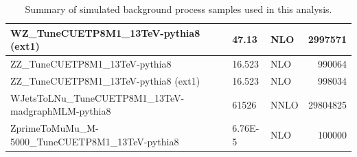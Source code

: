 \begin{table}[htbp!]
{\begin{tabular}{|l|l|l|r|}
WZ\_TuneCUETP8M1\_13TeV-pythia8 (ext1)                                                    &  47.13     & NLO  &  2997571 \\
\hline
ZZ\_TuneCUETP8M1\_13TeV-pythia8                                                           &  16.523    & NLO  &   990064 \\
ZZ\_TuneCUETP8M1\_13TeV-pythia8 (ext1)                                                    &  16.523    & NLO  &   998034 \\
\hline
WJetsToLNu\_TuneCUETP8M1\_13TeV-madgraphMLM-pythia8                                       &  61526     & NNLO & 29804825 \\ 
\hline
ZprimeToMuMu\_M-5000\_TuneCUETP8M1\_13TeV-pythia8                                         &  6.76E-5   & NLO  &   100000 \\ 
\hline
\end{tabular}
}
\caption{Summary of simulated background process samples used in this analysis.}
\label{table:MCsamples}
\end{table}

